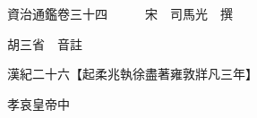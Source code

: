 










 


 
 


 

  
  
  
  
  





  
  
  
  
  
 
  

  

  
  
  



  

 
 

  
   




  

  
  


  　　資治通鑑卷三十四　　　宋　司馬光　撰

　　胡三省　音註

　　漢紀二十六【起柔兆執徐盡著雍敦牂凡三年】

　　孝哀皇帝中

